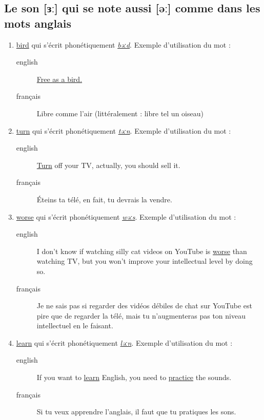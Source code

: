 \subsection{Le son [ɜː] qui se note aussi [əː] comme dans les mots anglais}
\label{sec:org53c6f2e}
\begin{enumerate}
\item \href{http://www.wordreference.com/enfr/bird}{bird} qui s'écrit phonétiquement \href{https://en.oxforddictionaries.com/definition/bird}{\emph{bəːd}}. Exemple d'utilisation du mot :
\begin{description}
\item[{english}] \textenglish{\href{https://genius.com/The-beatles-free-as-a-bird-lyrics}{Free as a bird.}}
\item[{français}] Libre comme l'air (littéralement : libre tel un
oiseau)
\end{description}
\item \href{http://www.wordreference.com/enfr/turn}{turn} qui s'écrit phonétiquement \href{https://en.oxforddictionaries.com/definition/turn}{\emph{təːn}}. Exemple d'utilisation du mot : 
\begin{description}
\item[{english}] \textenglish{\href{https://youtu.be/WLTI2rWAlV4}{Turn} off your TV, actually, you should sell it.}
\item[{français}] Éteins ta télé, en fait, tu devrais la vendre.
\end{description}
\item \href{http://www.wordreference.com/enfr/worse}{worse} qui s'écrit phonétiquement \href{https://en.oxforddictionaries.com/definition/worse}{\emph{wəːs}}. Exemple d'utilisation du mot : 
\begin{description}
\item[{english}] \textenglish{I don't know if watching silly cat videos on YouTube
is \href{https://youtu.be/JHWhzS0zdOc}{worse} than watching TV, but you won't improve your
intellectual level by doing so.}
\item[{français}] Je ne sais pas si regarder des vidéos débiles de chat
sur YouTube est pire que de regarder la télé, mais tu
n'augmenteras pas ton niveau intellectuel en le faisant.
\end{description}
\item \href{http://www.wordreference.com/enfr/learn}{learn} qui s'écrit phonétiquement \href{https://en.oxforddictionaries.com/definition/learn}{\emph{ləːn}}. Exemple d'utilisation du mot :
\begin{description}
\item[{english}] \textenglish{If you want to \href{https://youtu.be/1xXs7MAsB0w}{learn} English, you need to \href{https://youtu.be/wmCAKUFKZ7Y}{practice}
the sounds.}
\item[{français}] Si tu veux apprendre l'anglais, il faut que tu
pratiques les sons.
\end{description}
\end{enumerate}
